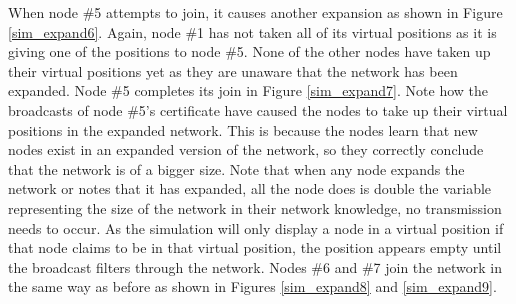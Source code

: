 \documentclass[ %
                    author={Luke Murray},
                supervisor={Dr. Simon Hollis},
                     title={Shadow Peer-to-Peer Networks},
                  subtitle={},
                    degree={MEng},
                      year={2013} ]{thesis}
\begin{document}
When node \#5 attempts to join, it causes another expansion as shown in Figure \ref{sim_expand6}. Again, node \#1 has not taken all of its virtual positions as it is giving one of the positions to node \#5. None of the other nodes have taken up their virtual positions yet as they are unaware that the network has been expanded. Node \#5 completes its join in Figure \ref{sim_expand7}. Note how the broadcasts of node \#5's certificate have caused the nodes to take up their virtual positions in the expanded network. This is because the nodes learn that new nodes exist in an expanded version of the network, so they correctly conclude that the network is of a bigger size. Note that when any node expands the network or notes that it has expanded, all the node does is double the variable representing the size of the network in their network knowledge, no transmission needs to occur. As the simulation will only display a node in a virtual position if that node claims to be in that virtual position, the position appears empty until the broadcast filters through the network. Nodes \#6 and \#7 join the network in the same way as before as shown in Figures \ref{sim_expand8} and \ref{sim_expand9}.
\end{document}
